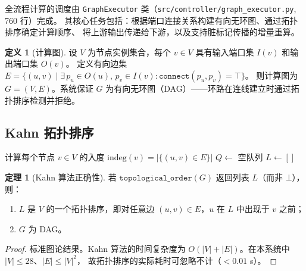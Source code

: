 \documentclass[12pt,a4paper]{ctexart}
\theoremstyle{definition}
\newtheorem{definition}{定义}[section]
\newtheorem{theorem}{定理}[section]
\theoremstyle{remark}
\begin{document}
全流程计算的调度由 \texttt{GraphExecutor} 类（\texttt{src/controller/graph\_executor.py}, 760 行）完成。
其核心任务包括：根据端口连接关系构建有向无环图、通过拓扑排序确定计算顺序、
将上游输出传递给下游，以及支持脏标记传播的增量重算。

\begin{definition}[计算图]
\label{def:comp-graph}
设 $V$ 为节点实例集合，每个 $v \in V$ 具有输入端口集 $I(v)$ 和输出端口集 $O(v)$。
定义有向边集 $E = \{(u, v) \mid \exists\, p_u \in O(u),\, p_v \in I(v): \texttt{connect}(p_u, p_v) = \top\}$。
则计算图为 $G = (V, E)$。系统保证 $G$ 为有向无环图（DAG）——环路在连线建立时通过拓扑排序检测并拒绝。
\end{definition}

\subsection{Kahn 拓扑排序}

\begin{algorithm}[htbp]
\caption{Kahn 拓扑排序（\texttt{topological\_order()}, 行 152--179）}
\label{alg:kahn}
\BlankLine
计算每个节点 $v \in V$ 的入度 $\text{indeg}(v) = |\{(u, v) \in E\}|$\;
$Q \gets$ 空队列\;
$L \gets []$\;
\end{algorithm}

\begin{theorem}[Kahn 算法正确性]
\label{thm:kahn-correct}
若 $\texttt{topological\_order}(G)$ 返回列表 $L$（而非 $\bot$），则：
\begin{enumerate}
  \item $L$ 是 $V$ 的一个拓扑排序，即对任意边 $(u, v) \in E$，$u$ 在 $L$ 中出现于 $v$ 之前；
  \item $G$ 为 DAG。
\end{enumerate}
\end{theorem}
\begin{proof}
标准图论结果。Kahn 算法的时间复杂度为 $O(|V| + |E|)$。在本系统中 $|V| \le 28$、$|E| \le |V|^2$，
故拓扑排序的实际耗时可忽略不计（$<0.01$ s）。
\end{proof}
\end{document}
